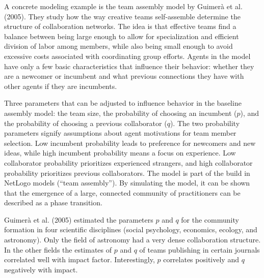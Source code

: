 \documentclass[
  letterpaper,
]{scrbook}
\begin{document}
A concrete modeling example is the team assembly model by Guimerà et al.
(2005). They study how the way creative teams self-assemble determine
the structure of collaboration networks. The idea is that effective
teams find a balance between being large enough to allow for
specialization and efficient division of labor among members, while also
being small enough to avoid excessive costs associated with coordinating
group efforts. Agents in the model have only a few basic characteristics
that influence their behavior: whether they are a newcomer or incumbent
and what previous connections they have with other agents if they are
incumbents.

Three parameters that can be adjusted to influence behavior in the
baseline assembly model: the team size, the probability of choosing an
incumbent (\(p\)), and the probability of choosing a previous
collaborator (\(q\)). The two probability parameters signify assumptions
about agent motivations for team member selection. Low incumbent
probability leads to preference for newcomers and new ideas, while high
incumbent probability means a focus on experience. Low collaborator
probability prioritizes experienced strangers, and high collaborator
probability prioritizes previous collaborators. The model is part of the
build in NetLogo models (``team assembly''). By simulating the model, it
can be shown that the emergence of a large, connected community of
practitioners can be described as a phase transition.

Guimerà et al. (2005) estimated the parameters \(p\) and \(q\) for the
community formation in four scientific disciplines (social psychology,
economics, ecology, and astronomy). Only the field of astronomy had a
very dense collaboration structure. In the other fields the estimates of
\(p\) and \(q\) of teams publishing in certain journals correlated well
with impact factor. Interestingly, \(p\) correlates positively and \(q\)
negatively with impact.
\end{document}

